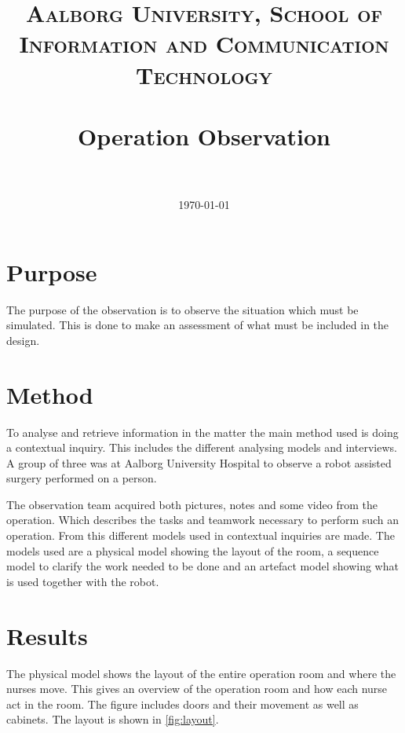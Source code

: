 \documentclass[paper=a4, fontsize=11pt]{scrartcl} %
\title{	
\normalfont \normalsize 
\textsc{Aalborg University, School of Information and Communication Technology} \\ [25pt] %
\horrule{0.5pt} \\[0.4cm] %
\huge Operation Observation \\ %
\horrule{2pt} \\[0.5cm] %
}
\date{\normalsize\today} %
\numberwithin{equation}{section} %
\numberwithin{figure}{section} %
\numberwithin{table}{section} %
\begin{document}
\maketitle %


\section{Purpose}
The purpose of the observation is to observe the situation which must be simulated. This is done to make an assessment of what must be included in the design.  

\section{Method}
To analyse and retrieve information in the matter the main method used is doing a contextual inquiry. This includes the different analysing models and interviews. A group of three was at Aalborg University Hospital to observe a robot assisted surgery performed on a person.

The observation team acquired both pictures, notes and some video from the operation. Which describes the tasks and teamwork necessary to perform such an operation. From this different models used in contextual inquiries are made. The models used are a physical model showing the layout of the room, a sequence model to clarify the work needed to be done and an artefact model showing what is used together with the robot.

\section{Results}
The physical model shows the layout of the entire operation room and where the nurses move. This gives an overview of the operation room and how each nurse act in the room. The figure includes doors and their movement as well as cabinets. The layout is shown in \autoref{fig:layout}.
\end{document}
